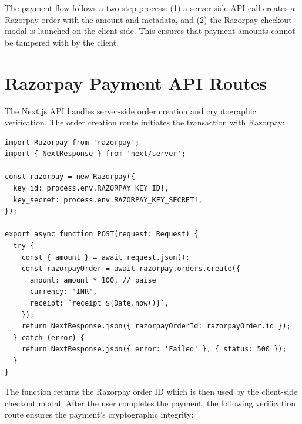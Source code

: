 \documentclass[a4paper,12pt,oneside]{report}
\begin{document}
\noindent The payment flow follows a two-step process: (1) a server-side API call creates a Razorpay order with the amount and metadata, and (2) the Razorpay checkout modal is launched on the client side. This ensures that payment amounts cannot be tampered with by the client.

\section{Razorpay Payment API Routes}

\noindent The Next.js API handles server-side order creation and cryptographic verification. The order creation route initiates the transaction with Razorpay:

\begin{lstlisting}[caption={Razorpay Order Creation (api/razorpay/create/route.ts)}, label={lst:paymentcreate}]
import Razorpay from 'razorpay';
import { NextResponse } from 'next/server';

const razorpay = new Razorpay({
  key_id: process.env.RAZORPAY_KEY_ID!,
  key_secret: process.env.RAZORPAY_KEY_SECRET!,
});

export async function POST(request: Request) {
  try {
    const { amount } = await request.json();
    const razorpayOrder = await razorpay.orders.create({
      amount: amount * 100, // paise 
      currency: 'INR',
      receipt: `receipt_${Date.now()}`,
    });
    return NextResponse.json({ razorpayOrderId: razorpayOrder.id });
  } catch (error) {
    return NextResponse.json({ error: 'Failed' }, { status: 500 });
  }
}
\end{lstlisting}

\noindent The function returns the Razorpay order ID which is then used by the client-side checkout modal. After the user completes the payment, the following verification route ensures the payment's cryptographic integrity:
\end{document}
